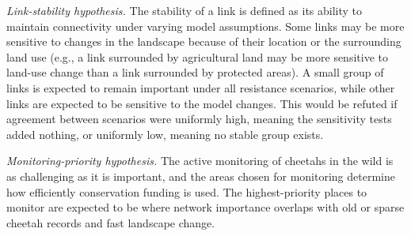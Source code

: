 \medskip
\noindent\textit{Link-stability hypothesis.} The stability of a link is defined as its ability to maintain connectivity under varying model assumptions. Some links may be more sensitive to changes in the landscape because of their location or the surrounding land use (e.g., a link surrounded by agricultural land may be more sensitive to land-use change than a link surrounded by protected areas). A small group of links is expected to remain important under all resistance scenarios, while other links are expected to be sensitive to the model changes. This would be refuted if agreement between scenarios were uniformly high, meaning the sensitivity tests added nothing, or uniformly low, meaning no stable group exists.

\medskip
\noindent\textit{Monitoring-priority hypothesis.} The active monitoring of cheetahs in the wild is as challenging as it is important, and the areas chosen for monitoring determine how efficiently conservation funding is used. The highest-priority places to monitor are expected to be where network importance overlaps with old or sparse cheetah records and fast landscape change.
